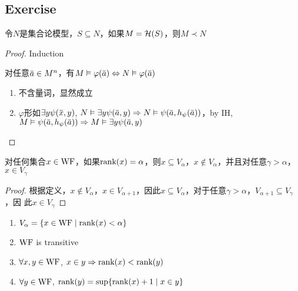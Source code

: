 \documentclass[11pt]{article}
\begin{document}
\subsection{Exercise}
\label{sec:org4c93779}
\begin{exercise}[7.10.1]
令\(N\)是集合论模型，\(S\subseteq N\)，如果\(M=\mathcal{H}(S)\)，则\(M\prec N\)
\end{exercise}

\begin{proof}
Induction

对任意\(\bara\in M^n\)，有\(M\vDash\varphi(\bara)\Leftrightarrow N\vDash\varphi(\bara)\)
\begin{enumerate}
\item 不含量词，显然成立
\item \(\varphi\)形如\(\exists y\psi(\barx,y)\), \(N\vDash\exists y\psi(\bara,y)\Rightarrow N\vDash\psi(\bara,h_\psi(\bara))\)，by
IH, \(M\vDash\psi(\bara,h_\psi(\bara))\Rightarrow M\vDash\exists y\psi(\bara,y)\)
\end{enumerate}
\end{proof}

\begin{exercise}[7.10.2]
对任何集合\(x\in\operatorname{WF}\)，如果\(\text{rank}(x)=\alpha\)，则\(x\subseteq V_\alpha\)，\(x\notin V_\alpha\)，并且对任意\(\gamma>\alpha\)，\(x\in V_\gamma\)
\end{exercise}

\begin{proof}
根据定义，\(x\notin V_\alpha\)，\(x\in V_{\alpha+1}\)，因此\(x\subseteq V_\alpha\)，对于任意\(\gamma>\alpha\)，\(V_{\alpha+1}\subseteq V_\gamma\)，因
此\(x\in V_\gamma\)
\end{proof}

\begin{exercise}[7.10.3]
\begin{enumerate}
\item \(V_\alpha=\{x\in\operatorname{WF}\mid\text{rank}(x)<\alpha\}\)
\item \(\operatorname{WF}\) is transitive
\item \(\forall x,y\in\operatorname{WF}\), \(x\in y\Rightarrow\text{rank}(x)<\text{rank}(y)\)
\item \(\forall y\in\operatorname{WF}\), \(\text{rank}(y)=\sup\{\text{rank}(x)+1\mid x\in y\}\)
\end{enumerate}
\end{exercise}
\end{document}
